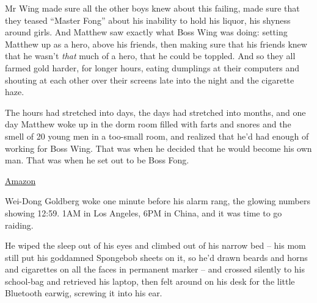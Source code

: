 Mr Wing made sure all the other boys knew about this failing, made
sure that they teased ``Master Fong'' about his inability to hold his
liquor, his shyness around girls. And Matthew saw exactly what Boss
Wing was doing: setting Matthew up as a hero, above his friends,
then making sure that his friends knew that he wasn't \emph{that}
much of a hero, that he could be toppled. And so they all farmed
gold harder, for longer hours, eating dumplings at their computers
and shouting at each other over their screens late into the night
and the cigarette haze.

The hours had stretched into days, the days had stretched into
months, and one day Matthew woke up in the dorm room filled with
farts and snores and the smell of 20 young men in a too-small room,
and realized that he'd had enough of working for Boss Wing. That
was when he decided that he would become his own man. That was when
he set out to be Boss Fong.

\tb

{\href{http://www.amazon.com/exec/obidos/ASIN/0765322161/downandoutint-20}{Amazon}}

Wei-Dong Goldberg woke one minute before his alarm rang, the
glowing numbers showing 12:59. 1AM in Los Angeles, 6PM in China,
and it was time to go raiding.

He wiped the sleep out of his eyes and climbed out of his narrow
bed -- his mom still put his goddamned Spongebob sheets on it, so
he'd drawn beards and horns and cigarettes on all the faces in
permanent marker -- and crossed silently to his school-bag and
retrieved his laptop, then felt around on his desk for the little
Bluetooth earwig, screwing it into his ear.

